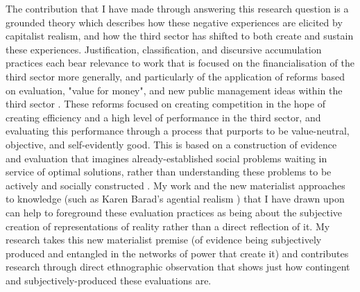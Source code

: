 The contribution that I have made through answering this research question is a grounded theory which describes how these negative experiences are elicited by capitalist realism, and how the third sector has shifted to both create and sustain these experiences. Justification, classification, and discursive accumulation practices each bear relevance to work that is focused on the financialisation of the third sector more generally, and particularly of the application of reforms based on evaluation, "value for money", and new public management ideas within the third sector \citep{mcmullin_challenging_2021}. These reforms focused on creating competition in the hope of creating efficiency and a high level of performance in the third sector, and evaluating this performance through a process that purports to be value-neutral, objective, and self-evidently good. This is based on a construction of evidence and evaluation that imagines already-established social problems waiting in service of optimal solutions, rather than understanding these problems to be actively and socially constructed \citep{greenhalgh_evidence-based_2009}. My work and the new materialist approaches to knowledge (such as Karen Barad's agential realism \citep[p. 45]{barad_meeting_2007}) that I have drawn upon can help to foreground these evaluation practices as being about the subjective creation of representations of reality rather than a direct reflection of it. My research takes this new materialist premise (of evidence being subjectively produced and entangled in the networks of power that create it) and contributes research through direct ethnographic observation that shows just how contingent and subjectively-produced these evaluations are. 

